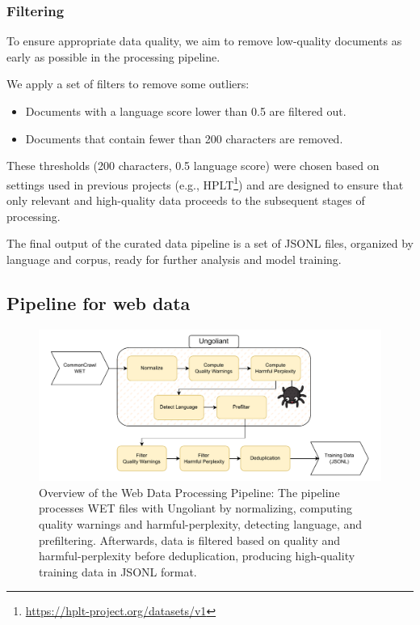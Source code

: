 \subsubsection{Filtering}
\label{sssec:pipelines.curated.prefiltering}

To ensure appropriate data quality, we aim to remove low-quality documents as early as possible in the processing pipeline. 

We apply a set of filters to remove some outliers:
\begin{itemize}
    \item Documents with a language score lower than 0.5 are filtered out.
    \item Documents that contain fewer than 200 characters are removed.
\end{itemize}

These thresholds (200 characters, 0.5 language score) were chosen based on settings used in previous projects (e.g., HPLT\footnote{\url{https://hplt-project.org/datasets/v1}}) and are designed to ensure that only relevant and high-quality data proceeds to the subsequent stages of processing.


The final output of the curated data pipeline is a set of JSONL files, organized by language and corpus, ready for further analysis and model training.


\subsection{Pipeline for web data}
\label{sec:pipelines.web}

\begin{figure}[ht]
    \centering
    \includegraphics[width=\linewidth]{images/Webdata_v2.xml.drawio.pdf}
    \caption{\label{fig:web_data_pipeline}%
    Overview of the Web Data Processing Pipeline: The pipeline processes WET files with Ungoliant by normalizing, computing quality warnings and harmful-perplexity, detecting language, and prefiltering. Afterwards, data is filtered based on quality and harmful-perplexity before deduplication, producing high-quality training data in JSONL format.
   }
\end{figure}

